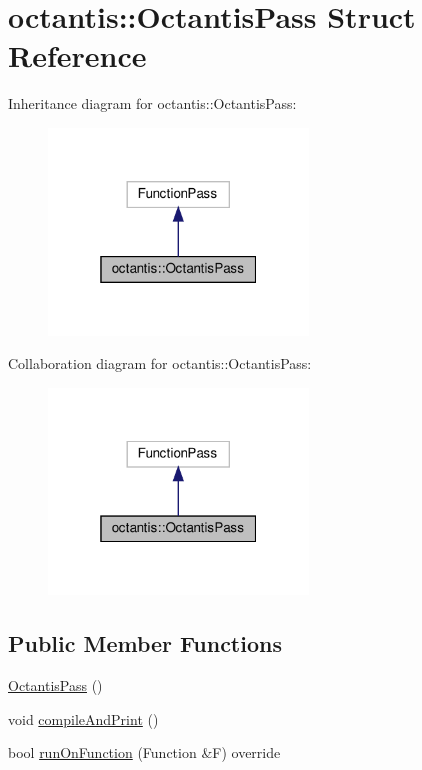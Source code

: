 \hypertarget{structoctantis_1_1OctantisPass}{}\section{octantis\+:\+:Octantis\+Pass Struct Reference}
\label{structoctantis_1_1OctantisPass}


Inheritance diagram for octantis\+:\+:Octantis\+Pass\+:
\nopagebreak
\begin{figure}[H]
\begin{center}
\leavevmode
\includegraphics[width=196pt]{structoctantis_1_1OctantisPass__inherit__graph}
\end{center}
\end{figure}


Collaboration diagram for octantis\+:\+:Octantis\+Pass\+:
\nopagebreak
\begin{figure}[H]
\begin{center}
\leavevmode
\includegraphics[width=196pt]{structoctantis_1_1OctantisPass__coll__graph}
\end{center}
\end{figure}
\subsection*{Public Member Functions}
\begin{DoxyCompactItemize}
\item 
\hyperlink{structoctantis_1_1OctantisPass_a47caf34ff1187522621d58f636579af7}{Octantis\+Pass} ()
\item 
void \hyperlink{structoctantis_1_1OctantisPass_a9928748c5a25565dec5b98ccba4b12c3}{compile\+And\+Print} ()
\item 
bool \hyperlink{structoctantis_1_1OctantisPass_a2d156c9326f2eaf75969e34aa09df2e5}{run\+On\+Function} (Function \&F) override
\end{DoxyCompactItemize}
